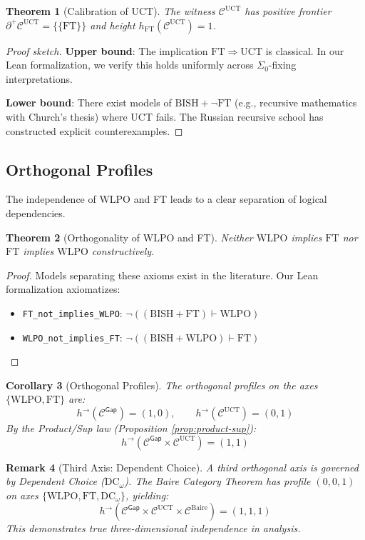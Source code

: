 \documentclass[11pt]{article}
\newtheorem{theorem}{Theorem}[section]
\newtheorem{corollary}[theorem]{Corollary}
\newtheorem{remark}[theorem]{Remark}
\newcommand{\WLPO}{\mathrm{WLPO}}
\newcommand{\FT}{\mathrm{FT}}
\newcommand{\UCT}{\mathrm{UCT}}
\newcommand{\DCw}{\mathrm{DC}_\omega}
\newcommand{\BISH}{\mathrm{BISH}}
\newcommand{\SigmaZero}{\Sigma_{0}}
\newcommand{\Frontierpos}{\partial^{+}}
\begin{document}
\begin{theorem}[Calibration of UCT]\label{thm:uct-calibration}
The witness $\mathcal{C}^{\mathrm{UCT}}$ has positive frontier $\Frontierpos\mathcal{C}^{\mathrm{UCT}} = \{\{\FT\}\}$ and height $h_{\FT}(\mathcal{C}^{\mathrm{UCT}}) = 1$.
\end{theorem}
\begin{proof}[Proof sketch]
\textbf{Upper bound}: The implication $\FT \Rightarrow \UCT$ is classical. In our Lean formalization, we verify this holds uniformly across $\SigmaZero$-fixing interpretations.

\textbf{Lower bound}: There exist models of $\BISH + \neg\FT$ (e.g., recursive mathematics with Church's thesis) where UCT fails. The Russian recursive school has constructed explicit counterexamples.
\end{proof}

\subsection{Orthogonal Profiles}

The independence of WLPO and FT leads to a clear separation of logical dependencies.

\begin{theorem}[Orthogonality of WLPO and FT]
Neither $\WLPO$ implies $\FT$ nor $\FT$ implies $\WLPO$ constructively.
\end{theorem}
\begin{proof}
Models separating these axioms exist in the literature. Our Lean formalization axiomatizes:
\begin{itemize}
\item \texttt{FT\_not\_implies\_WLPO}: $\neg((\BISH + \FT) \vdash \WLPO)$
\item \texttt{WLPO\_not\_implies\_FT}: $\neg((\BISH + \WLPO) \vdash \FT)$
\end{itemize}
\end{proof}

\begin{corollary}[Orthogonal Profiles]\label{cor:orthogonal}
The orthogonal profiles on the axes $\{\WLPO, \FT\}$ are:
\[
h^{\to}(\mathcal{C}^{\mathsf{Gap}})=(1, 0), \qquad h^{\to}(\mathcal{C}^{\mathrm{UCT}})=(0, 1)
\]
By the Product/Sup law (Proposition \ref{prop:product-sup}):
\[
h^{\to}(\mathcal{C}^{\mathsf{Gap}} \times \mathcal{C}^{\mathrm{UCT}}) = (1, 1)
\]
\end{corollary}

\begin{remark}[Third Axis: Dependent Choice]
A third orthogonal axis is governed by Dependent Choice ($\DCw$). The Baire Category Theorem has profile $(0, 0, 1)$ on axes $\{\WLPO, \FT, \DCw\}$, yielding:
\[
h^{\to}(\mathcal{C}^{\mathsf{Gap}} \times \mathcal{C}^{\mathrm{UCT}} \times \mathcal{C}^{\text{Baire}}) = (1, 1, 1)
\]
This demonstrates true three-dimensional independence in analysis.
\end{remark}
\end{document}
